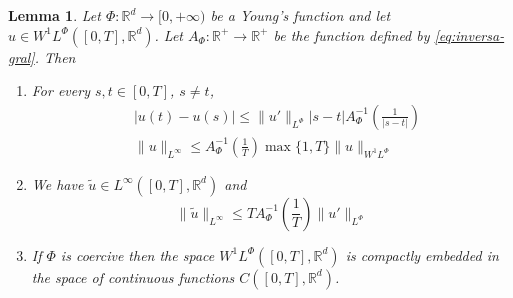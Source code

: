 \documentclass[twoside]{article}
\newtheorem{lem}[thm]{Lemma}
\theoremstyle{remark}
\newcommand{\orlnor}{\|_{L^{\Phi}}}
\newcommand{\linf}{\|_{L^{\infty}}}
\newcommand{\lphi}{L^{\Phi}}
\newcommand{\wphi}{W^{1}\lphi}
\newcommand{\sobnor}{\|_{W^{1}\lphi}}
\newcommand{\rr}{\mathbb{R}}
\renewcommand{\leq}{\leqslant}
\begin{document}
\begin{lem}\label{inclusion orlicz} Let $\Phi:\rr^d\to [0,+\infty)$ be a Young's 
function and let $u\in\wphi([0,T],\rr^d)$. Let 
$A_{\Phi}: \rr^+ \to \rr^+$ be the function defined by \eqref{eq:inversa-gral}. Then
\begin{enumerate}
\item\label{inclusion orlicz_item1} For every $s,t\in [0,T]$, $s\neq t$,
\begin{align}
 &|u(t)-u(s)| \leq
 \|u'\orlnor |s-t|A_{\Phi}^{-1}\left(\frac{1}{|s-t|}\right)\tag{Morrey's inequality}\label{in-sob-cont}
\\
& \| u\linf \leq A_\Phi^{-1}\left(\frac{1}{T}\right)\max\{1,T\}\|u\sobnor\tag{Sobolev's inequality}\label{sobolev}
\end{align}
\item We have $\widetilde{u}\in L^{\infty}([0,T],\rr^d)$ and
\[
\|\widetilde u \linf \leq T A_{\Phi}^{-1}\left(\frac{1}{T}\right)\|u'\orlnor
\tag{Sobolev-Wirtinger's inequality}\label{wirtinger}
\]
\item\label{it:embeding} If $\Phi$ is coercive then the space $\wphi([0,T],\rr^d)$ is compactly embedded in the space of continuous functions $C([0,T],\rr^d)$.
\end{enumerate}
\end{lem}
\end{document}

